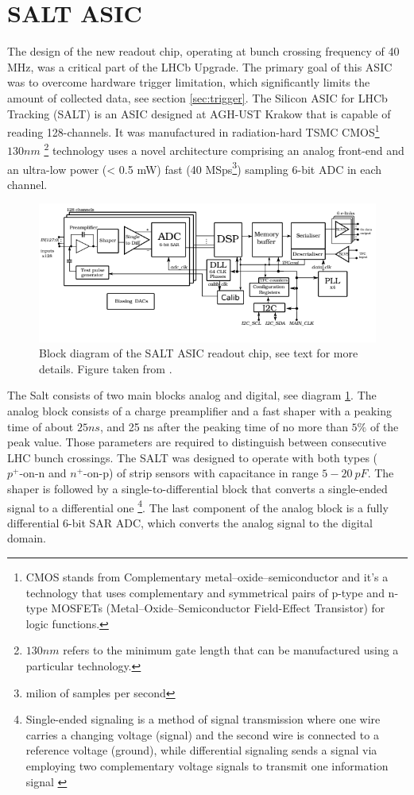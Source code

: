  \section{SALT ASIC}
 \label{sec:salt}
The design of the new readout chip, operating at bunch crossing frequency of 40 MHz, was a critical part of the LHCb Upgrade. The primary goal of this ASIC was to overcome hardware trigger limitation, which significantly limits the amount of collected data, see section \ref{sec:trigger}. 
The Silicon ASIC for LHCb Tracking (SALT) is an ASIC designed at AGH-UST Krakow that is capable of reading 128-channels. It was manufactured in radiation-hard TSMC CMOS\footnote{CMOS stands from Complementary metal–oxide–semiconductor and it's a technology that uses complementary and symmetrical pairs of p-type and n-type  MOSFETs (Metal–Oxide–Semiconductor Field-Effect Transistor) for logic functions.} $130 nm$ \footnote{$130 nm$ refers to the minimum gate length that can be manufactured using a particular technology. } technology uses a novel architecture comprising an analog front-end and an ultra-low power (< 0.5 mW) fast (40 MSps\footnote{milion of samples per second}) sampling 6-bit ADC in each channel. 


\begin{figure}[ht!]
\centering
\includegraphics{figures/SALT_2.PNG}
\caption{Block diagram of the SALT ASIC readout chip, see text for more details. Figure taken from \cite{SALT}.
\label{fig:SALT}}
\end{figure}


The Salt consists of two main blocks analog and digital, see diagram \ref{fig:SALT}. The analog block consists of a charge preamplifier and a fast shaper with a peaking time of about $25 ns$, and 25 ns after the peaking time of no more than $5\%$ of the peak value.  Those parameters are required to distinguish between consecutive LHC bunch crossings. The SALT was designed to operate with both types ($p^{+}\text{-on-n}$ and $n^{+}\text{-on-p}$) of strip sensors with capacitance in range $5-20~ pF$. 
The shaper is followed by a single-to-differential block that converts a single-ended signal to a differential one \footnote{Single-ended signaling is a method of signal transmission where one wire carries a changing voltage (signal) and the second wire is connected to a reference voltage (ground), while differential signaling sends a signal via employing two complementary voltage signals to transmit one information signal \cite{signals}}. The last component of the analog block is a fully differential 6-bit SAR ADC, which converts the analog signal to the digital domain. 

